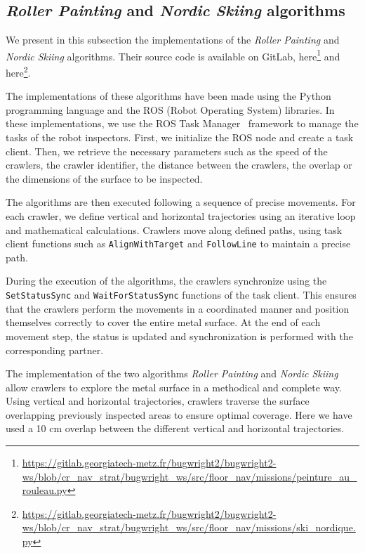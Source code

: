 \documentclass[english,RandD]{rapportPFE}  %
\begin{document}
		\subsection*{\textit{Roller Painting} and \textit{Nordic Skiing} algorithms}
			We present in this subsection the implementations of the \textit{Roller Painting} and \textit{Nordic Skiing} algorithms.
			Their source code is available on GitLab, here\footnote{\url{https://gitlab.georgiatech-metz.fr/bugwright2/bugwright2-ws/blob/cr_nav_strat/bugwright_ws/src/floor_nav/missions/peinture_au_rouleau.py}} and here\footnote{\url{https://gitlab.georgiatech-metz.fr/bugwright2/bugwright2-ws/blob/cr_nav_strat/bugwright_ws/src/floor_nav/missions/ski_nordique.py}}.

			The implementations of these algorithms have been made using the Python programming language and the ROS (Robot Operating System) libraries.
			In these implementations, we use the ROS Task Manager~\cite{ROSTaskManager} framework to manage the tasks of the robot inspectors.
			First, we initialize the ROS node and create a task client.
			Then, we retrieve the necessary parameters such as the speed of the crawlers, the crawler identifier, the distance between the crawlers, the overlap or the dimensions of the surface to be inspected.

			The algorithms are then executed following a sequence of precise movements.
			For each crawler, we define vertical and horizontal trajectories using an iterative loop and mathematical calculations.
			Crawlers move along defined paths, using task client functions such as \texttt{AlignWithTarget} and \texttt{FollowLine} to maintain a precise path.

			During the execution of the algorithms, the crawlers synchronize using the \texttt{SetStatusSync} and \texttt{WaitForStatusSync} functions of the task client.
			This ensures that the crawlers perform the movements in a coordinated manner and position themselves correctly to cover the entire metal surface.
			At the end of each movement step, the status is updated and synchronization is performed with the corresponding partner.

			The implementation of the two algorithms \textit{Roller Painting} and \textit{Nordic Skiing} allow crawlers to explore the metal surface in a methodical and complete way.
			Using vertical and horizontal trajectories, crawlers traverse the surface overlapping previously inspected areas to ensure optimal coverage.
			Here we have used a 10 cm overlap between the different vertical and horizontal trajectories.
\end{document}
